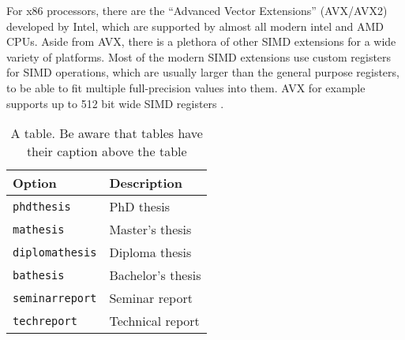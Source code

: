 \documentclass[a4paper,oneside,10pt,ngerman,english]{scrartcl}
\begin{document}
For x86 processors, there are the “Advanced Vector Extensions” (AVX/AVX2) developed by Intel, which are supported by almost all modern intel and AMD CPUs. Aside from AVX, there is a plethora of other SIMD extensions for a wide variety of platforms. Most of the modern SIMD extensions use custom registers for SIMD operations, which are usually larger than the general purpose registers, to be able to fit multiple full-precision values into them. AVX for example supports up to 512 bit wide SIMD registers \cite{computerbase_avx_2008, intel_avx512_2023}.

\begin{table}
\centering
\caption{
    A table. Be aware that tables have their caption above the table
}\label{tab:nicetable}
\begin{tabularx}{\linewidth}{l>{\raggedright\arraybackslash}X}
\toprule
\textbf{Option}        & \textbf{Description} \\
\midrule
\texttt{phdthesis}     & PhD thesis \\
\texttt{mathesis}      & Master's thesis \\
\texttt{diplomathesis} & Diploma thesis \\
\texttt{bathesis}      & Bachelor's thesis \\
\texttt{seminarreport} & Seminar report \\
\texttt{techreport}    & Technical report \\
\bottomrule
\end{tabularx}
\end{table}
\end{document}
